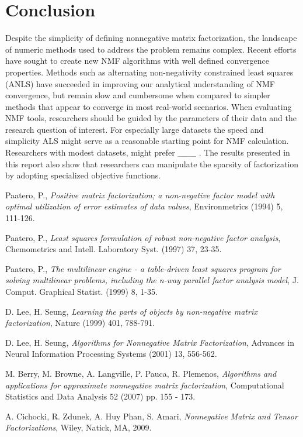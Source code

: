 \documentclass[final,leqno,onefignum,onetabnum]{siamltex1213}
\begin{document}
\section{Conclusion} Despite the simplicity of defining nonnegative matrix factorization, the landscape of numeric methods used to address the problem remains complex. Recent efforts have sought to create new NMF algorithms with well defined convergence properties. Methods such as alternating non-negativity constrained least squares (ANLS) have succeeded in improving our analytical understanding of NMF convergence, but remain slow and cumbersome when compared to simpler methods that appear to converge in most real-world scenarios. When evaluating NMF tools, researchers should be guided by the parameters of their data and the research question of interest. For especially large datasets the speed and simplicity ALS might serve as a reasonable starting point for NMF calculation. Researchers with modest datasets, might prefer ___ . The results presented in this report also show that researchers can manipulate the sparsity of factorization by adopting specialized objective functions. 

\begin{thebibliography}{1}

 {\sc Paatero, P.},
{\em Positive matrix factorization; a non-negative factor model with optimal utilization of error estimates of data values}, Environmetrics (1994) 5, 111-126.

 {\sc Paatero, P.},
{\em Least squares formulation of robust non-negative factor analysis}, Chemometrics and Intell. Laboratory Syst. (1997) 37, 23-35.

 {\sc Paatero, P.},
{\em The multilinear engine - a table-driven least squares program for solving multilinear problems, including the n-way parallel factor analysis model}, J. Comput. Graphical Statist. (1999) 8, 1-35.

 {\sc D. Lee, H. Seung},
{\em Learning the parts of objects by non-negative matrix factorization}, Nature (1999) 401, 788-791.

 {\sc D. Lee, H. Seung},
{\em Algorithms for Nonnegative Matrix Factorization}, Advances in Neural Information Processing Systems (2001) 13, 556-562.

 {\sc M. Berry, M. Browne, A. Langville, P. Pauca, R. Plemenos},
{\em Algorithms and applications for approximate nonnegative matrix factorization}, Computational Statistics and Data Analysis 52 (2007) pp. 155 - 173.

 {\sc A. Cichocki, R. Zdunek, A. Huy Phan, S. Amari}, {\em Nonnegative Matrix and Tensor Factorizations}, Wiley, Natick, MA, 2009.

\end{thebibliography}
\end{document}
